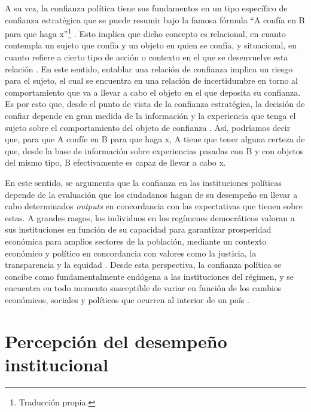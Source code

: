 \documentclass[12pt,twoside]{templates/facsothesis}
\begin{document}
A su vez, la confianza política tiene sus fundamentos en un tipo específico de confianza estratégica que se puede resumir bajo la famosa fórmula ``A confía en B para que haga x''\footnote{Traducción propia.} \citep[26]{hardinWeWantTrust1999}. Esto implica que dicho concepto es relacional, en cuanto contempla un sujeto que confía y un objeto en quien se confía, y situacional, en cuanto refiere a cierto tipo de acción o contexto en el que se desenvuelve esta relación \citep{citrinPoliticalTrustCynical2018, vandermeerEconomicPerformancePolitical2018, vandermeerDeeplyRootedConcern2017}. En este sentido, entablar una relación de confianza implica un riesgo para el sujeto, el cual se encuentra en una relación de incertidumbre en torno al comportamiento que va a llevar a cabo el objeto en el que deposita su confianza. Es por esto que, desde el punto de vista de la confianza estratégica, la decisión de confiar depende en gran medida de la información y la experiencia que tenga el sujeto sobre el comportamiento del objeto de confianza \citep{uslanerMoralFoundationsTrust2002, uslanerStudyTrust2017}. Así, podríamos decir que, para que A confíe en B para que haga x, A tiene que tener alguna certeza de que, desde la base de información sobre experiencias pasadas con B y con objetos del mismo tipo, B efectivamente es capaz de llevar a cabo x.

En este sentido, se argumenta que la confianza en las instituciones políticas depende de la evaluación que los ciudadanos hagan de su desempeño en llevar a cabo determinados \emph{outputs} en concordancia con las expectativas que tienen sobre estas. A grandes rasgos, los individuos en los regímenes democráticos valoran a sus instituciones en función de su capacidad para garantizar prosperidad económica para amplios sectores de la población, mediante un contexto económico y político en concordancia con valores como la justicia, la transparencia y la equidad \citep{andersonSensitiveLeftImpervious2008, vandermeerEconomicPerformancePolitical2018, vandermeerDeeplyRootedConcern2017, zmerliPoliticalTrust2022, zmerliIncomeInequalityDistributive2015}. Desde esta perspectiva, la confianza política se concibe como fundamentalmente endógena a las instituciones del régimen, y se encuentra en todo momento susceptible de variar en función de los cambios económicos, sociales y políticos que ocurren al interior de un país \citep{newtonSocialPoliticalTrust2017}.

\section{Percepción del desempeño institucional}\label{percepciuxf3n-del-desempeuxf1o-institucional}
\end{document}
